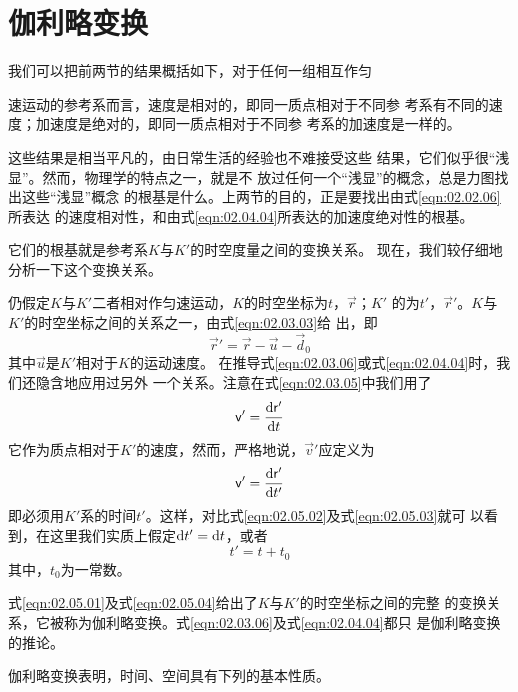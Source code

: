 \section{伽利略变换}\label{sec:02.05}

我们可以把前两节的结果概括如下，对于任何一组相互作匀

\noindent 速运动的参考系而言，速度是相对的，即同一质点相对于不同参
考系有不同的速度；加速度是绝对的，即同一质点相对于不同参
考系的加速度是一样的。

这些结果是相当平凡的，由日常生活的经验也不难接受这些
结果，它们似乎很“浅显”。然而，物理学的特点之一，就是不
放过任何一个“浅显”的概念，总是力图找出这些“浅显”概念
的根基是什么。上两节的目的，正是要找出由式\eqref{eqn:02.02.06}所表达
的速度相对性，和由式\eqref{eqn:02.04.04}所表达的加速度绝对性的根基。

它们的根基就是参考系$K$与$K'$的时空度量之间的变换关系。
现在，我们较仔细地分析一下这个变换关系。

仍假定$K$与$K'$二者相对作匀速运动，$K$的时空坐标为$t$，$\vec{r}$；$K'$
的为$t'$，$\vec{r}'$。$K$与$K'$的时空坐标之间的关系之一，由式\eqref{eqn:02.03.03}给
出，即
\begin{equation}\label{eqn:02.05.01}
    \vec{r}'=\vec{r}-\vec{u}-\vec{d}_0
\end{equation}
其中$\vec{u}$是$K'$相对于$K$的运动速度。
在推导式\eqref{eqn:02.03.06}或式\eqref{eqn:02.04.04}时，我们还隐含地应用过另外
一个关系。注意在式\eqref{eqn:02.03.05}中我们用了
\begin{equation}\label{eqn:02.05.02}
    {\mathsf{v}}'=\frac{{\rm d} {\mathsf{r}}'}{{\rm d} t}
\end{equation}
它作为质点相对于$K'$的速度，然而，严格地说，$\vec{v}'$应定义为
\begin{equation}\label{eqn:02.05.03}
    {\mathsf{v}}'=\frac{{\rm d} {\mathsf{r}}'}{{\rm d} t'}
\end{equation}
即必须用$K'$系的时间$t'$。这样，对比式\eqref{eqn:02.05.02}及式\eqref{eqn:02.05.03}就可
以看到，在这里我们实质上假定${\rm d} t'={\rm d} t$，或者
\begin{equation}\label{eqn:02.05.04}
    t'=t+t_0
\end{equation}
其中，$t_0$为一常数。

式\eqref{eqn:02.05.01}及式\eqref{eqn:02.05.04}给出了$K$与$K'$的时空坐标之间的完整
的变换关系，它被称为伽利略变换。式\eqref{eqn:02.03.06}及式\eqref{eqn:02.04.04}都只
\clearpage
\noindent 是伽利略变换的推论。

伽利略变换表明，时间、空间具有下列的基本性质。

